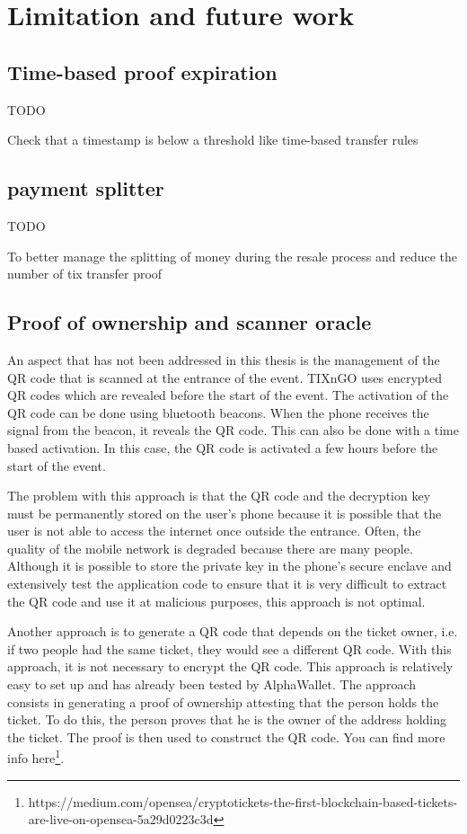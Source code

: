 \documentclass[a4paper,11pt,oneside]{report}
\begin{document}
\chapter{Limitation and future work}

\section{Time-based proof expiration}
TODO

Check that a timestamp is below a threshold like time-based transfer rules

\section{payment splitter}
TODO

To better manage the splitting of money during the resale process and reduce the number of tix transfer proof

\section{Proof of ownership and scanner oracle}
An aspect that has not been addressed in this thesis is the management of the QR code that is scanned at the entrance of the event. TIXnGO uses encrypted QR codes which are revealed before the start of the event. The activation of the QR code can be done using bluetooth beacons. When the phone receives the signal from the beacon, it reveals the QR code. This can also be done with a time based activation. In this case, the QR code is activated a few hours before the start of the event.

The problem with this approach is that the QR code and the decryption key must be permanently stored on the user's phone because it is possible that the user is not able to access the internet once outside the entrance. Often, the quality of the mobile network is degraded because there are many people. Although it is possible to store the private key in the phone's secure enclave and extensively test the application code to ensure that it is very difficult to extract the QR code and use it at malicious purposes, this approach is not optimal.

Another approach is to generate a QR code that depends on the ticket owner, i.e. if two people had the same ticket, they would see a different QR code. With this approach, it is not necessary to encrypt the QR code. This approach is relatively easy to set up and has already been tested by AlphaWallet. The approach consists in generating a proof of ownership attesting that the person holds the ticket. To do this, the person proves that he is the owner of the address holding the ticket. The proof is then used to construct the QR code. You can find more info here\footnote{https://medium.com/opensea/cryptotickets-the-first-blockchain-based-tickets-are-live-on-opensea-5a29d0223c3d}.
\end{document}
